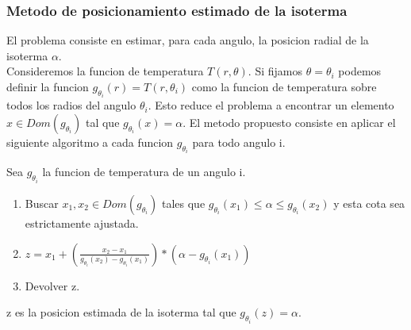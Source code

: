 \subsubsection{Metodo de posicionamiento estimado de la isoterma}
El problema consiste en estimar, para cada angulo, la posicion radial de la isoterma \texttt{$\alpha$}.\\
Consideremos la funcion de temperatura $T(r,\theta)$. Si fijamos $\theta = \theta_i$ podemos definir la funcion $g_{\theta_i}(r) = T(r,\theta_i)$ como la funcion de temperatura sobre todos los radios del angulo $\theta_i$. Esto reduce el problema a encontrar un elemento $ x \in Dom(g_{\theta_i}) $ tal que $g_{\theta_i}(x) = \alpha$. El metodo propuesto consiste en aplicar el siguiente algoritmo a cada funcion $g_{\theta_i}$ para todo angulo i.
\begin{theorem}
    Sea $g_{\theta_i}$ la funcion de temperatura de un angulo i.
    \begin{enumerate}
        \item Buscar $ x_1, x_2 \in Dom(g_{\theta_i}) $ tales que $ g_{\theta_i}(x_1) \leq \alpha \leq g_{\theta_i}(x_2)$ y esta cota sea estrictamente ajustada.
        
        \item $z = x_1 + \left(\frac{x_2 - x_1}{g_{\theta_i}(x_2) - g_{\theta_i}(x_1)}\right) * (\alpha - g_{\theta_i}(x_1))$

        \item Devolver z.
    \end{enumerate}
    z es la posicion estimada de la isoterma tal que $g_{\theta_i}(z) = \alpha$.
\end{theorem}

